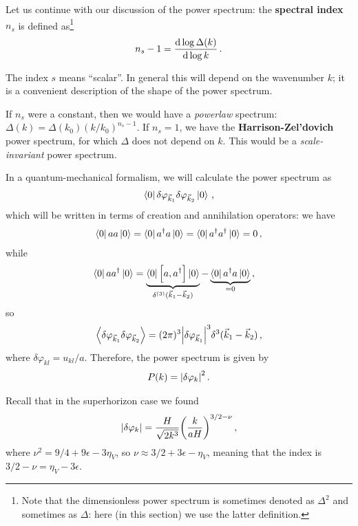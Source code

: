 \documentclass[main.tex]{subfiles}
\begin{document}
Let us continue with our discussion of the power spectrum: the \textbf{spectral index} \(n_s\) is defined as\footnote{Note that the dimensionless power spectrum is sometimes denoted as \(\Delta^2\) and sometimes as \(\Delta \): here (in this section) we use the latter definition.}
%
\begin{align}
n_s - 1 = \dv{\log \Delta (k)}{\log k}
\,.
\end{align}

The index \(s\) means ``scalar''. 
In general this will depend on the wavenumber \(k\); it is a convenient description of the shape of the power spectrum. 

If \(n_s\) were a constant, then we would have a \emph{powerlaw} spectrum: \(\Delta (k) = \Delta (k_0 ) (k / k_0 )^{n_s - 1}\). 
If \(n_s = 1\), we have the \textbf{Harrison-Zel'dovich} power spectrum, for which \(\Delta \) does not depend on \(k\).
This would be a \emph{scale-invariant} power spectrum.

In a quantum-mechanical formalism, we will calculate the power spectrum as 
%
\begin{align}
\bra{0} \delta \varphi _{\vec{k}_1} \delta \varphi _{\vec{k}_2} \ket{0}
\,,
\end{align}
%
which will be written in terms of creation and annihilation operators: we have 
%
\begin{align}
\bra{0} a a \ket{0}=
\bra{0} a ^\dag a  \ket{0}=
\bra{0} a ^\dag a ^\dag \ket{0}= 0
\,,
\end{align}
%
while 
%
\begin{align}
\bra{0} a a ^\dag \ket{0} &= \underbrace{\bra{0} \qty[a, a ^\dag] \ket{0}}_{ \delta^{(3)} (\vec{k}_1 - \vec{k}_2)} - \underbrace{\bra{0} a ^\dag a \ket{0}}_{= 0} 
\,,
\end{align}
%
so 
%
\begin{align}
\expval{ \delta \varphi _{\vec{k}_1} \delta \varphi _{\vec{k}_2}} = (2 \pi )^3 \abs{ \delta \varphi _{\vec{k}_1}}^3 \delta^3(\vec{k}_1 - \vec{k}_2)
\,,
\end{align}
%
where \(\delta \varphi _{kl} = u_{kl} / a\). 
Therefore, the power spectrum is given by 
%
\begin{align}
P(k) = \abs{ \delta \varphi _k}^2
\,.
\end{align}

Recall that in the superhorizon case we found 
%
\begin{align}
\abs{ \delta \varphi _k} = \frac{H}{\sqrt{2 k^3}} \qty( \frac{k}{aH})^{3/2 - \nu }
\,,
\end{align}
%
where \(\nu^2 = 9/4 + 9 \epsilon - 3 \eta _V\), so \(\nu \approx 3/2 + 3\epsilon - \eta _V \), meaning that the index is \(3/2 - \nu = \eta _V - 3 \epsilon \). 
\end{document}
